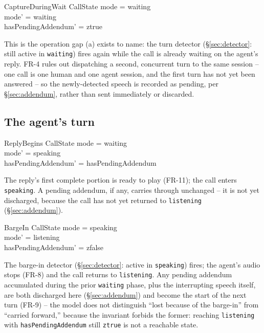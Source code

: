 \documentclass[a4paper,10pt,fleqn]{article}
\begin{document}
\begin{schema}{CaptureDuringWait}
  \Delta CallState
  \where
  mode = waiting \\
  mode' = waiting \\
  hasPendingAddendum' = ztrue
\end{schema}

This is the operation gap (a) exists to name: the turn detector
(\S\ref{sec:detector}: still active in \texttt{waiting}) fires again while
the call is already waiting on the agent's reply. FR-4 rules out
dispatching a second, concurrent turn to the same session -- one call is one
human and one agent session, and the first turn has not yet been answered --
so the newly-detected speech is recorded as pending, per
\S\ref{sec:addendum}, rather than sent immediately or discarded.

\subsection{The agent's turn}

\begin{schema}{ReplyBegins}
  \Delta CallState
  \where
  mode = waiting \\
  mode' = speaking \\
  hasPendingAddendum' = hasPendingAddendum
\end{schema}

The reply's first complete portion is ready to play (FR-11); the call
enters \texttt{speaking}. A pending addendum, if any, carries through
unchanged -- it is not yet discharged, because the call has not yet
returned to \texttt{listening} (\S\ref{sec:addendum}).

\begin{schema}{BargeIn}
  \Delta CallState
  \where
  mode = speaking \\
  mode' = listening \\
  hasPendingAddendum' = zfalse
\end{schema}

The barge-in detector (\S\ref{sec:detector}: active in \texttt{speaking})
fires; the agent's audio stops (FR-8) and the call returns to
\texttt{listening}. Any pending addendum accumulated during the prior
\texttt{waiting} phase, plus the interrupting speech itself, are both
discharged here (\S\ref{sec:addendum}) and become the start of the next turn
(FR-9) -- the model does not distinguish ``lost because of the barge-in''
from ``carried forward,'' because the invariant forbids the former: reaching
\texttt{listening} with \texttt{hasPendingAddendum} still \texttt{ztrue} is
not a reachable state.
\end{document}
